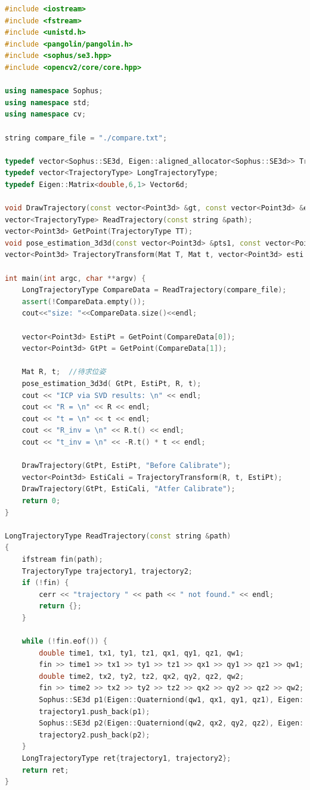 \documentclass[40pt,a4paper，UTF8]{ctexart}
\numberwithin{equation}{section}
\begin{document}
\begin{lstlisting}[language=C++, caption=main.cpp]
#include <iostream>
#include <fstream>
#include <unistd.h>
#include <pangolin/pangolin.h>
#include <sophus/se3.hpp>
#include <opencv2/core/core.hpp>

using namespace Sophus;
using namespace std;
using namespace cv;

string compare_file = "./compare.txt";

typedef vector<Sophus::SE3d, Eigen::aligned_allocator<Sophus::SE3d>> TrajectoryType;
typedef vector<TrajectoryType> LongTrajectoryType;
typedef Eigen::Matrix<double,6,1> Vector6d;

void DrawTrajectory(const vector<Point3d> &gt, const vector<Point3d> &esti, const string& title);
vector<TrajectoryType> ReadTrajectory(const string &path);
vector<Point3d> GetPoint(TrajectoryType TT);
void pose_estimation_3d3d(const vector<Point3d> &pts1, const vector<Point3d> &pts2, Mat &R, Mat &t);
vector<Point3d> TrajectoryTransform(Mat T, Mat t, vector<Point3d> esti );

int main(int argc, char **argv) {
    LongTrajectoryType CompareData = ReadTrajectory(compare_file);
    assert(!CompareData.empty());
    cout<<"size: "<<CompareData.size()<<endl;

    vector<Point3d> EstiPt = GetPoint(CompareData[0]);
    vector<Point3d> GtPt = GetPoint(CompareData[1]);

    Mat R, t;  //待求位姿
    pose_estimation_3d3d( GtPt, EstiPt, R, t);
    cout << "ICP via SVD results: \n" << endl;
    cout << "R = \n" << R << endl;
    cout << "t = \n" << t << endl;
    cout << "R_inv = \n" << R.t() << endl;
    cout << "t_inv = \n" << -R.t() * t << endl;

    DrawTrajectory(GtPt, EstiPt, "Before Calibrate");
    vector<Point3d> EstiCali = TrajectoryTransform(R, t, EstiPt);
    DrawTrajectory(GtPt, EstiCali, "Atfer Calibrate");
    return 0;
}

LongTrajectoryType ReadTrajectory(const string &path)
{
    ifstream fin(path);
    TrajectoryType trajectory1, trajectory2;
    if (!fin) {
        cerr << "trajectory " << path << " not found." << endl;
        return {};
    }

    while (!fin.eof()) {
        double time1, tx1, ty1, tz1, qx1, qy1, qz1, qw1;
        fin >> time1 >> tx1 >> ty1 >> tz1 >> qx1 >> qy1 >> qz1 >> qw1;
        double time2, tx2, ty2, tz2, qx2, qy2, qz2, qw2;
        fin >> time2 >> tx2 >> ty2 >> tz2 >> qx2 >> qy2 >> qz2 >> qw2;
        Sophus::SE3d p1(Eigen::Quaterniond(qw1, qx1, qy1, qz1), Eigen::Vector3d(tx1, ty1, tz1));
        trajectory1.push_back(p1);
        Sophus::SE3d p2(Eigen::Quaterniond(qw2, qx2, qy2, qz2), Eigen::Vector3d(tx2, ty2, tz2));
        trajectory2.push_back(p2);
    }
    LongTrajectoryType ret{trajectory1, trajectory2};
    return ret;
}



\end{lstlisting}
\end{document}

